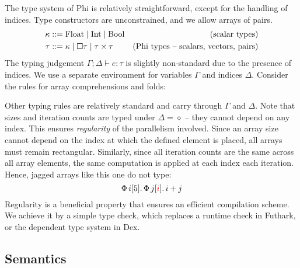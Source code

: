 The type system of Phi is relatively straightforward, except for the handling of indices. Type constructors are unconstrained, and we allow arrays of pairs.
\begin{align*}
\kappa &::= \phifloattype \mid \phiinttype \mid \phibooltype & \text{(scalar types)} \\
\tau &::= \kappa \mid \phivectype{\tau} \mid \phipairtype{\tau}{\tau} & \text{(Phi types -- scalars, vectors, pairs)}
\end{align*}
The typing judgement $\Gamma; \Delta \vdash e : \tau$ is slightly non-standard due to the presence of indices. We use a separate environment for variables $\Gamma$ and indices $\Delta$. Consider the rules for array comprehensions and folds:
\begin{center}
    \begin{prooftree}[center=false]
    \end{prooftree} \quad
    \begin{prooftree}[center=false]
    \end{prooftree}
\end{center}
Other typing rules are relatively standard and carry through $\Gamma$ and $\Delta$. Note that sizes and iteration counts are typed under $\Delta = \diamond$ -- they cannot depend on any index. This ensures \textit{regularity} of the parallelism involved. Since an array size cannot depend on the index at which the defined element is placed, all arrays must remain rectangular. Similarly, since all iteration counts are the same across all array elements, the same computation is applied at each index each iteration. Hence, jagged arrays like this one do not type:
$$ \phivec{i}{5}{\phivec{j}{\textcolor{red}{i}}{i + j}} $$
Regularity is a beneficial property that ensures an efficient compilation scheme. We achieve it by a simple type check, which replaces a runtime check in Futhark, or the dependent type system in Dex. 

\subsection{Semantics}

